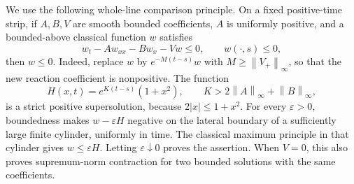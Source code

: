 \documentclass[11pt,reqno]{amsart}
\numberwithin{equation}{section}
\theoremstyle{definition}
\theoremstyle{remark}
\newcommand{\norm}[1]{\left\lVert#1\right\rVert}
\begin{document}
We use the following whole-line comparison principle. On a fixed positive-time strip, if $A,B,V$ are smooth bounded coefficients, $A$ is uniformly positive, and a bounded-above classical function $w$ satisfies
\[
 w_t-Aw_{xx}-Bw_x-Vw\leq0,\qquad w(\cdot,s)\leq0,
\]
then $w\leq0$. Indeed, replace $w$ by $e^{-M(t-s)}w$ with $M\geq\norm{V_+}_\infty$, so that the new reaction coefficient is nonpositive. The function
\[
 H(x,t)=e^{K(t-s)}(1+x^2),\qquad
 K>2\norm A_\infty+\norm B_\infty,
\]
is a strict positive supersolution, because $2|x|\leq1+x^2$. For every $\varepsilon>0$, boundedness makes $w-\varepsilon H$ negative on the lateral boundary of a sufficiently large finite cylinder, uniformly in time. The classical maximum principle in that cylinder gives $w\leq\varepsilon H$. Letting $\varepsilon\downarrow0$ proves the assertion. When $V=0$, this also proves supremum-norm contraction for two bounded solutions with the same coefficients.
\end{document}
